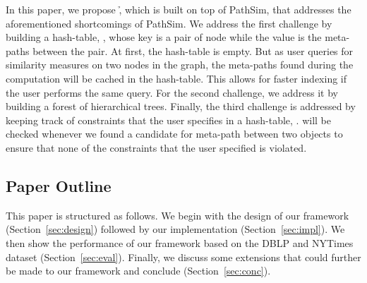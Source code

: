 In this paper, we propose \h, which is built on top of PathSim, that addresses
the aforementioned shortcomings of PathSim. We address the first challenge by
building a hash-table, \mTable, whose key is a pair of node while the value is
the meta-paths between the pair. At first, the hash-table is empty. But as user
queries for similarity measures on two nodes in the graph, the meta-paths found
during the computation will be cached in the hash-table. This allows for faster
indexing if the user performs the same query. For the second challenge, we
address it by building a forest of hierarchical trees. Finally, the third
challenge is addressed by keeping track of constraints that the user specifies
in a hash-table, \cTable. \cTable will be checked whenever we found a candidate
for meta-path between two objects to ensure that none of the constraints that
the user specified is violated.

\subsection{Paper Outline}

This paper is structured as follows. We begin with the design of our framework
(Section~\ref{sec:design}) followed by our implementation
(Section~\ref{sec:impl}). We then show the performance of our framework
based on the DBLP and NYTimes dataset (Section~\ref{sec:eval}).
Finally, we discuss some extensions that could further be made to our framework
and conclude (Section~\ref{sec:conc}).
